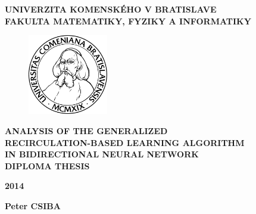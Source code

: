 \begin{center}
    \large{
        \textbf{
            UNIVERZITA KOMENSKÉHO V BRATISLAVE \\ 
            FAKULTA MATEMATIKY, FYZIKY A INFORMATIKY
        }
    }
\end{center}

\vspace{2cm}

\begin{figure}[!h]
    \centering
    \includegraphics[width=3.5cm]{img/komlogo-new}
\end{figure}

\vspace{1cm}

\begin{center}
    \large{
        \textbf{
            ANALYSIS OF THE GENERALIZED \\
            RECIRCULATION-BASED LEARNING ALGORITHM \\
            IN BIDIRECTIONAL NEURAL NETWORK \\
            \vspace{3cm}
            DIPLOMA THESIS
        }
    }
\end{center}

\vfill

\begin{multicols}{2}
    \begin{flushleft}
        \textbf{2014}
    \end{flushleft}
    \begin{flushright}
        \textbf{Peter CSIBA}
    \end{flushright}
\end{multicols}
